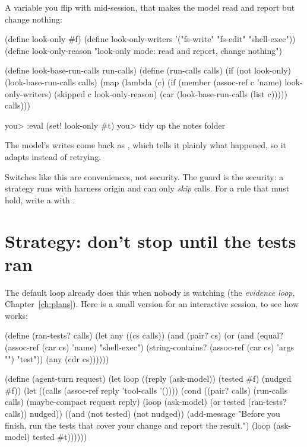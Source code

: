 A variable you flip with  mid-session, that makes the model
read and report but change nothing:

\begin{scm}
(define look-only #f)
(define look-only-writers '("fs-write" "fs-edit" "shell-exec"))
(define look-only-reason "look-only mode: read and report, change nothing")

(define look-base-run-calls run-calls)
(define (run-calls calls)
  (if (not look-only)
      (look-base-run-calls calls)
      (map (lambda (c)
             (if (member (assoc-ref c 'name) look-only-writers)
                 (skipped c look-only-reason)
                 (car (look-base-run-calls (list c)))))
           calls)))
\end{scm}

\begin{txt}
you> :eval (set! look-only #t)
you> tidy up the notes folder
\end{txt}

The model's writes come back as ,
which tells it plainly what happened, so it adapts instead of retrying.

\begin{careful}
Switches like this are conveniences, not security. The guard is the
security: a strategy runs with harness origin and can only \emph{skip}
calls. For a rule that must hold, write a  with
.
\end{careful}

\section{Strategy: don't stop until the tests ran}

The default loop already does this when nobody is watching (the
\emph{evidence loop}, Chapter~\ref{ch:plans}). Here is a small version for
an interactive session, to see how  works:

\begin{scm}
(define (ran-tests? calls)
  (let any ((cs calls))
    (and (pair? cs)
         (or (and (equal? (assoc-ref (car cs) 'name) "shell-exec")
                  (string-contains? (assoc-ref (car cs) 'args "") "test"))
             (any (cdr cs))))))

(define (agent-turn request)
  (let loop ((reply (ask-model)) (tested #f) (nudged #f))
    (let ((calls (assoc-ref reply 'tool-calls '())))
      (cond ((pair? calls)
             (run-calls calls)
             (maybe-compact request reply)
             (loop (ask-model) (or tested (ran-tests? calls)) nudged))
            ((and (not tested) (not nudged))
             (add-message "Before you finish, run the tests that cover your change and report the result.")
             (loop (ask-model) tested #t))))))
\end{scm}

